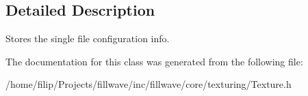 \subsection{Detailed Description}
Stores the single file configuration info. 

The documentation for this class was generated from the following file\+:\begin{DoxyCompactItemize}
\item 
/home/filip/\+Projects/fillwave/inc/fillwave/core/texturing/Texture.\+h\end{DoxyCompactItemize}
